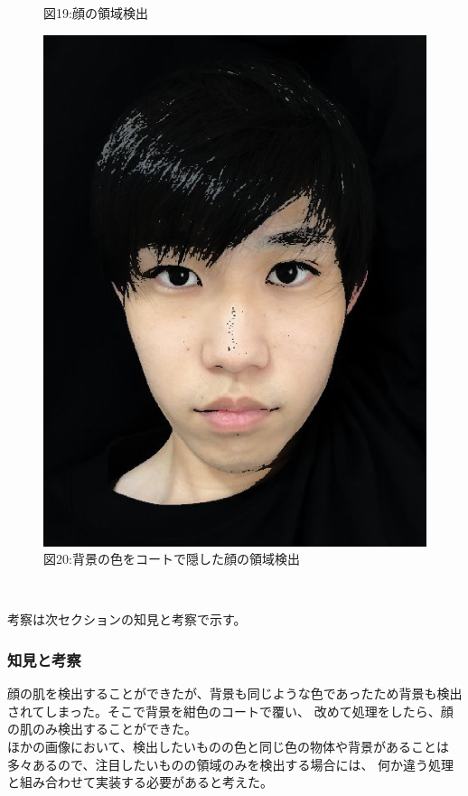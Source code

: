 ﻿\documentclass[a4j,11pt]{jarticle}
\begin{document}
\begin{figure}[tb]
\begin{minipage}{0.49\hsize}
   図19:顔の領域検出
 \end{minipage}
 \begin{minipage}{0.49\hsize} %
   \center
   \includegraphics[width=\hsize]{./eps/color-myface2.eps}
   図20:背景の色をコートで隠した顔の領域検出
 \end{minipage}
 \
\end{figure}

考察は次セクションの知見と考察で示す。
\subsubsection{知見と考察}
顔の肌を検出することができたが、背景も同じような色であったため背景も検出されてしまった。そこで背景を紺色のコートで覆い、
改めて処理をしたら、顔の肌のみ検出することができた。\\
ほかの画像において、検出したいものの色と同じ色の物体や背景があることは多々あるので、注目したいものの領域のみを検出する場合には、
何か違う処理と組み合わせて実装する必要があると考えた。
\end{document}
